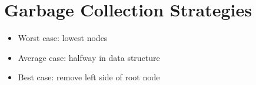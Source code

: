 \section{Garbage Collection Strategies}


\begin{itemize}
  \item Worst case:   lowest nodes
  \item Average case: halfway in data structure
  \item Best case:    remove left side of root node
\end{itemize}